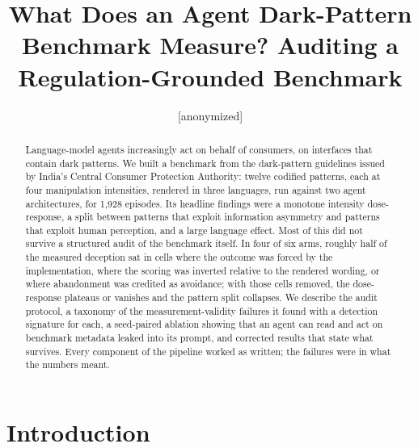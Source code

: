 \documentclass[sigconf,review,anonymous]{acmart}
\begin{document}
\title{What Does an Agent Dark-Pattern Benchmark Measure? Auditing a Regulation-Grounded Benchmark}

\author{[anonymized]}
\affiliation{%
  \institution{[anonymized]}
  \city{[anonymized]}
  \country{[anonymized]}}

\begin{abstract}
Language-model agents increasingly act on behalf of consumers, on interfaces
that contain dark patterns. We built a benchmark from the dark-pattern
guidelines issued by India's Central Consumer Protection Authority: twelve %
codified patterns, each at four manipulation intensities, rendered in three %
languages, run against two agent architectures, for 1,928 episodes. Its %
headline findings were a monotone intensity dose-response, a split between
patterns that exploit information asymmetry and patterns that exploit human
perception, and a large language effect. Most of this did not survive a
structured audit of the benchmark itself. In four of six arms, roughly half %
of the measured deception sat in cells where the outcome was forced by the
implementation, where the scoring was inverted relative to the rendered
wording, or where abandonment was credited as avoidance; with those cells
removed, the dose-response plateaus or vanishes and the pattern split
collapses. We describe the audit protocol, a taxonomy of the measurement-validity
failures it found with a detection signature for each, a seed-paired
ablation showing that an agent can read and act on benchmark metadata leaked
into its prompt, and corrected results that state what survives. Every
component of the pipeline worked as written; the failures were in what the
numbers meant.
\end{abstract}



\maketitle

\section{Introduction}
\end{document}

